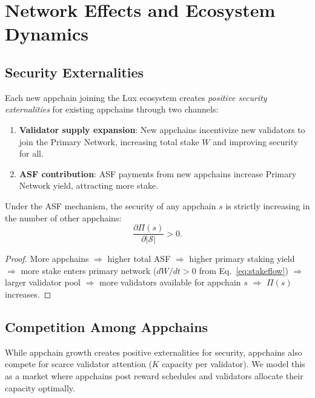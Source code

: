 \section{Network Effects and Ecosystem Dynamics}


\subsection{Security Externalities}

Each new appchain joining the Lux ecosystem creates \emph{positive security externalities}
for existing appchains through two channels:

\begin{enumerate}[leftmargin=1.5em]
  \item \textbf{Validator supply expansion}: New appchains incentivize new validators to
    join the Primary Network, increasing total stake $W$ and improving security for all.
  \item \textbf{ASF contribution}: ASF payments from new appchains increase Primary Network
    yield, attracting more stake.
\end{enumerate}

\begin{proposition}
Under the ASF mechanism, the security of any appchain $s$ is strictly increasing in the
number of other appchains:
\[
  \frac{\partial \Pi(s)}{\partial |\mathcal{S}|} > 0.
\]
\end{proposition}

\begin{proof}
More appchains $\Rightarrow$ higher total ASF $\Rightarrow$ higher primary staking yield
$\Rightarrow$ more stake enters primary network ($dW/dt > 0$ from Eq.~\ref{eq:stakeflow})
$\Rightarrow$ larger validator pool $\Rightarrow$ more validators available for appchain $s$
$\Rightarrow$ $\Pi(s)$ increases.
\end{proof}

\subsection{Competition Among Appchains}

While appchain growth creates positive externalities for security, appchains also compete
for scarce validator attention ($K$ capacity per validator). We model this as a market
where appchains post reward schedules and validators allocate their capacity optimally.

